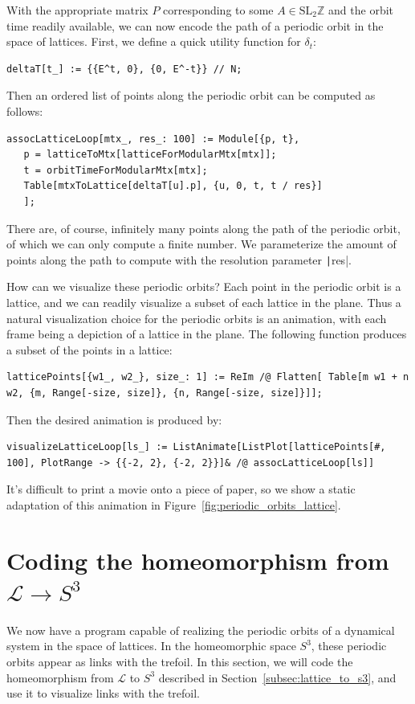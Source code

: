 \documentclass[12pt,twoside]{reedthesis}
\theoremstyle{definition}
\newcommand{\Z}{\mathbb{Z}}
\newcommand{\LS}{\mathcal{L}}
\newcommand{\SLZ}{\mathrm{SL}_2{\Z}}
\begin{document}
With the appropriate matrix $P$ corresponding to some $A \in \SLZ$ and the orbit time readily available, we can now encode the path of a periodic orbit in the space of lattices.
First, we define a quick utility function for $\delta_t$:
\begin{verbatim}
deltaT[t_] := {{E^t, 0}, {0, E^-t}} // N;
\end{verbatim}
Then an ordered list of points along the periodic orbit can be computed as follows:
\begin{verbatim}
assocLatticeLoop[mtx_, res_: 100] := Module[{p, t},
   p = latticeToMtx[latticeForModularMtx[mtx]];
   t = orbitTimeForModularMtx[mtx];
   Table[mtxToLattice[deltaT[u].p], {u, 0, t, t / res}]
   ];
\end{verbatim}
There are, of course, infinitely many points along the path of the periodic orbit, of which we can only compute a finite number.
We parameterize the amount of points along the path to compute with the resolution parameter \texttt|res|.

How can we visualize these periodic orbits?
Each point in the periodic orbit is a lattice, and we can readily visualize a subset of each lattice in the plane.
Thus a natural visualization choice for the periodic orbits is an animation, with each frame being a depiction of a lattice in the plane.
The following function produces a subset of the points in a lattice:
\begin{verbatim}
latticePoints[{w1_, w2_}, size_: 1] := ReIm /@ Flatten[ Table[m w1 + n w2, {m, Range[-size, size]}, {n, Range[-size, size]}]];
\end{verbatim}
Then the desired animation is produced by:
\begin{verbatim}
visualizeLatticeLoop[ls_] := ListAnimate[ListPlot[latticePoints[#, 100], PlotRange -> {{-2, 2}, {-2, 2}}]& /@ assocLatticeLoop[ls]]
\end{verbatim}
It's difficult to print a movie onto a piece of paper, so we show a static adaptation of this animation in Figure~\ref{fig:periodic_orbits_lattice}.

\section{Coding the homeomorphism from $\LS \to S^3$}

We now have a program capable of realizing the periodic orbits of a dynamical system in the space of lattices.
In the homeomorphic space $S^3$, these periodic orbits appear as links with the trefoil.
In this section, we will code the homeomorphism from $\LS$ to $S^3$ described in Section~\ref{subsec:lattice_to_s3}, and use it to visualize links with the trefoil.
\end{document}
